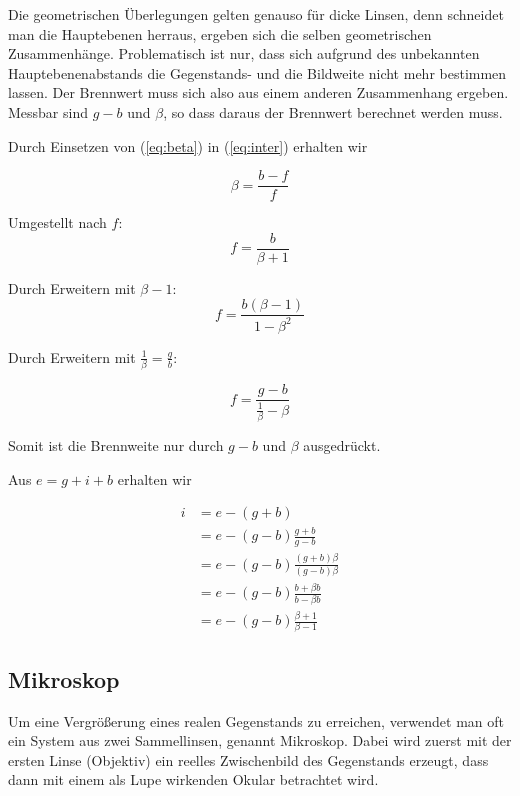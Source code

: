 \documentclass[a4paper,german,12pt,smallheadings]{scrartcl}
\begin{document}
Die geometrischen Überlegungen gelten genauso für dicke Linsen, denn schneidet
man die Hauptebenen herraus, ergeben sich die selben geometrischen
Zusammenhänge.  Problematisch ist nur, dass sich aufgrund des unbekannten
Hauptebenenabstands die Gegenstands- und die Bildweite nicht mehr bestimmen
lassen. Der Brennwert muss sich also aus einem anderen Zusammenhang ergeben.
Messbar sind $g-b$ und $\beta$, so dass daraus der Brennwert berechnet werden
muss.

Durch Einsetzen von (\ref{eq:beta}) in (\ref{eq:inter}) erhalten wir

\begin{equation}
  \beta = \frac{b-f}{f}
\end{equation}

Umgestellt nach $f$:
\begin{equation}
  f = \frac{b}{\beta + 1}
\end{equation}

Durch Erweitern mit $\beta - 1$:
\begin{equation}
  f = \frac{b(\beta - 1)}{1-\beta^2}
\end{equation}

Durch Erweitern mit $\frac{1}{\beta} = \frac{g}{b}$:

\begin{equation}
  f = \frac{g - b}{\frac{1}{\beta} - \beta}
\end{equation}

Somit ist die Brennweite nur durch $g-b$ und $\beta$ ausgedrückt.

Aus $e = g + i + b$ erhalten wir

\begin{align*}
  i &= e - (g+b) \\
    &= e - (g-b) \frac{g+b}{g-b} \\
    &= e - (g-b) \frac{(g+b)\beta}{(g-b)\beta} \\
    &= e - (g-b) \frac{b + \beta b}{b - \beta b} \\
    &= e - (g-b) \frac{\beta + 1}{\beta - 1}
\end{align*}

\subsection{Mikroskop}
Um eine Vergrößerung eines realen Gegenstands zu erreichen, verwendet man oft
ein System aus zwei Sammellinsen, genannt Mikroskop. Dabei wird zuerst mit der
ersten Linse (Objektiv) ein reelles Zwischenbild des Gegenstands erzeugt, dass
dann mit einem als Lupe wirkenden Okular betrachtet wird.
\end{document}
